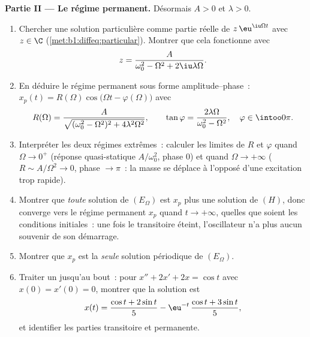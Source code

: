 \begin{problem}
\medskip
\noindent\textbf{Partie II --- Le régime permanent.} Désormais $A > 0$
et $\lambda > 0$.
\begin{enumerate}[resume]
  \item Chercher une solution particulière comme partie réelle de
        $z\,\eu^{\iu\Omega t}$ avec $z \in \C$
        (\cref{met:b1:diffeq:particular}). Montrer que cela fonctionne
        avec
        \[
        z = \frac{A}{\omega_0^2 - \Omega^2 + 2\iu\lambda\Omega} .
        \]
  \item En déduire le régime permanent sous forme
        amplitude--phase~: $x_p(t) = R(\Omega)\cos\bigl(\Omega t -
        \varphi(\Omega)\bigr)$ avec
        \[
        R(\Omega) = \frac{A}{\sqrt{(\omega_0^2 - \Omega^2)^2 +
        4\lambda^2\Omega^2}},
        \qquad
        \tan\varphi = \frac{2\lambda\Omega}{\omega_0^2 -
        \Omega^2},
        \quad \varphi \in \intoo0\pi .
        \]
  \item Interpréter les deux régimes extrêmes~: calculer les limites
        de $R$ et $\varphi$ quand $\Omega \to 0^+$ (réponse
        quasi-statique $A/\omega_0^2$, phase $0$) et quand $\Omega \to
        +\infty$ ($R \sim A/\Omega^2 \to 0$, phase $\to \pi$~: la
        masse se déplace à l'opposé d'une excitation trop rapide).
  \item Montrer que \emph{toute} solution de $(E_\Omega)$ est $x_p$
        plus une solution de $(H)$, donc converge vers le régime
        permanent $x_p$ quand $t \to +\infty$, quelles que soient les
        conditions initiales~: une fois le transitoire éteint,
        l'oscillateur n'a plus aucun souvenir de son démarrage.
  \item Montrer que $x_p$ est la \emph{seule} solution périodique de
        $(E_\Omega)$.
  \item Traiter un  jusqu'au bout~: pour $x'' + 2x'
        + 2x = \cos t$ avec $x(0) = x'(0) = 0$, montrer que la
        solution est
        \[
        x(t) = \frac{\cos t + 2\sin t}5
        - \eu^{-t}\,\frac{\cos t + 3\sin t}5 ,
        \]
        et identifier les parties transitoire et permanente.
\end{enumerate}


\end{problem}
